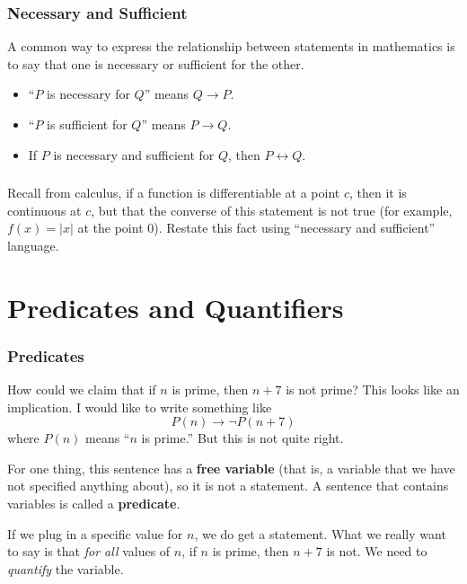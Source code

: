 \documentclass[11pt, compress]{beamer}
\newcommand{\terminology}[1]{\textbf{#1}}\newcommand{\lt}{<}
\renewcommand{\iff}{\leftrightarrow}
\newcommand{\imp}{\rightarrow}
\begin{document}
\begin{frame}
\frametitle{Necessary and Sufficient}
 A common way to express the relationship between statements in mathematics is to say that one is necessary or sufficient for the other.
\pause 

\begin{itemize}[<+->]
\item{} ``\(P\) is necessary for \(Q\)'' means \(Q \imp P\).

\item{} ``\(P\) is sufficient for \(Q\)'' means \(P \imp Q\).

\item{} If \(P\) is necessary and sufficient for \(Q\), then \(P \iff Q\).

\end{itemize}

\end{frame}
 
\begin{frame}
\frametitle{}
\begin{example}[0.2.9]Recall from calculus, if a function is differentiable at a point \(c\), then it is continuous at \(c\), but that the converse of this statement is not true (for example, \(f(x) = |x|\) at the point 0). Restate this fact using ``necessary and sufficient'' language.
\end{example}
\end{frame}
 


\section{Predicates and Quantifiers}
\begin{frame}
\frametitle{Predicates}
  How could we claim that if \(n\) is prime, then \(n+7\) is not prime? This looks like an implication. I would like to write something like%
\begin{equation*}
P(n) \imp \neg P(n+7)
\end{equation*}
where \(P(n)\) means ``\(n\) is prime.'' But this is not quite right.
 
\pause 

For one thing, this sentence has a \terminology{free variable} (that is, a variable that we have not specified anything about), so it is not a statement.  A sentence that contains variables is called a \terminology{predicate}.
 
\pause 

If we plug in a specific value for \(n\), we do get a statement. What we really want to say is that \emph{for all} values of \(n\), if \(n\) is prime, then \(n+7\) is not. We need to \emph{quantify} the variable.
\end{frame}
 
\end{document}
